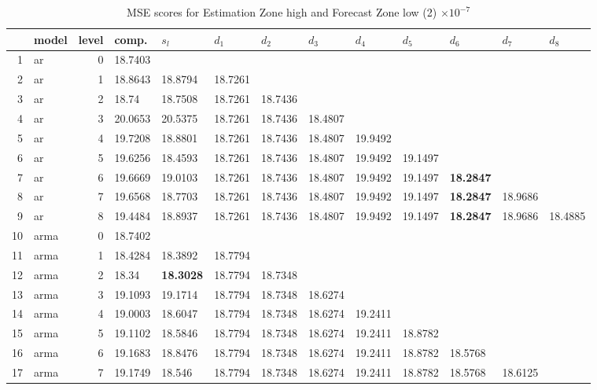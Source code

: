 \documentclass[10pt,a4paper]{article}
\begin{document}
\begin{table}[ht]
\centering
\caption{MSE scores for Estimation Zone high and Forecast Zone low (2) $ \times 10^{-7}$} 
\begin{tabular}{rlrllllllllll}
  \hline
 & model & level & comp. & $s_l$ & $d_1$ & $d_2$ & $d_3$ & $d_4$ & $d_5$ & $d_6$ & $d_7$ & $d_8$ \\ 
  \hline
1 & ar &     0 & 18.7403 &  &  &  &  &  &  &  &  &  \\ 
  2 & ar &     1 & 18.8643 & 18.8794 & 18.7261 &  &  &  &  &  &  &  \\ 
  3 & ar &     2 & 18.74 & 18.7508 & 18.7261 & 18.7436 &  &  &  &  &  &  \\ 
  4 & ar &     3 & 20.0653 & 20.5375 & 18.7261 & 18.7436 & 18.4807 &  &  &  &  &  \\ 
  5 & ar &     4 & 19.7208 & 18.8801 & 18.7261 & 18.7436 & 18.4807 & 19.9492 &  &  &  &  \\ 
  6 & ar &     5 & 19.6256 & 18.4593 & 18.7261 & 18.7436 & 18.4807 & 19.9492 & 19.1497 &  &  &  \\ 
  7 & ar &     6 & 19.6669 & 19.0103 & 18.7261 & 18.7436 & 18.4807 & 19.9492 & 19.1497 & \textbf{18.2847} &  &  \\ 
  8 & ar &     7 & 19.6568 & 18.7703 & 18.7261 & 18.7436 & 18.4807 & 19.9492 & 19.1497 & \textbf{18.2847} & 18.9686 &  \\ 
  9 & ar &     8 & 19.4484 & 18.8937 & 18.7261 & 18.7436 & 18.4807 & 19.9492 & 19.1497 & \textbf{18.2847} & 18.9686 & 18.4885 \\ 
   \hline
10 & arma &     0 & 18.7402 &  &  &  &  &  &  &  &  &  \\ 
  11 & arma &     1 & 18.4284 & 18.3892 & 18.7794 &  &  &  &  &  &  &  \\ 
  12 & arma &     2 & 18.34 & \textbf{18.3028} & 18.7794 & 18.7348 &  &  &  &  &  &  \\ 
  13 & arma &     3 & 19.1093 & 19.1714 & 18.7794 & 18.7348 & 18.6274 &  &  &  &  &  \\ 
  14 & arma &     4 & 19.0003 & 18.6047 & 18.7794 & 18.7348 & 18.6274 & 19.2411 &  &  &  &  \\ 
  15 & arma &     5 & 19.1102 & 18.5846 & 18.7794 & 18.7348 & 18.6274 & 19.2411 & 18.8782 &  &  &  \\ 
  16 & arma &     6 & 19.1683 & 18.8476 & 18.7794 & 18.7348 & 18.6274 & 19.2411 & 18.8782 & 18.5768 &  &  \\ 
  17 & arma &     7 & 19.1749 & 18.546 & 18.7794 & 18.7348 & 18.6274 & 19.2411 & 18.8782 & 18.5768 & 18.6125 &  \\ 

\end{tabular}
\end{table}
\end{document}
